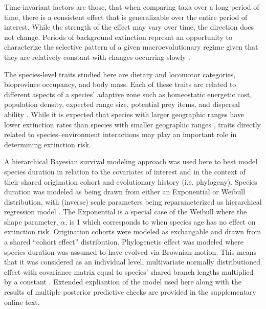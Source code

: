 \documentclass[12pt]{article}
\begin{document}
Time-invariant factors are those, that when comparing taxa over a long period of time, there is a consistent effect that is generalizable over the entire period of interest. While the strength of the effect may vary over time, the direction does not change. Periods of background extinction represnt an opportunity to characterize the selective pattern of a given macroevolutionary regime given that they are relatively constant with changes occurring slowly \cite{Jablonski1986,Raup1988}.

The species-level traits studied here are dietary and locomotor categories, bioprovince occupancy, and body mass. Each of these traits are related to different aspects of a species' adaptive zone such as homeostatic energetic cost, population density, expected range size, potential prey items, and dispersal ability \cite{Smith2004,Jernvall2004}. While it is expected that species with larger geographic ranges have lower extinction rates than species with smaller geographic ranges \cite{Jablonski1986,Roy2009c}, traits directly related to species--environment interactions may play an important role in determining extinction risk.

A hierarchical Bayesian survival modeling approach was used here to best model species duration in relation to the covariates of interest and in the context of their shared origination cohort and evolutionary history (i.e. phylogeny). Species duration was modeled as being drawn from either an Exponential or Weibull distribution, with (inverse) scale parameters being reparameterized as hierarchical regression model \cite{Gelman2013d}. The Exponential is a special case of the Weibull where the shape parameter, $\alpha$, is 1 which corresponds to when species age has no effect on extinction risk. Origination cohorts were modeled as exchangable and drawn from a shared ``cohort effect'' distribution. Phylogenetic effect was modeled where species duration was assumed to have evolved via Brownian motion. This means that it was considered as an individual level, multivariate normally distributioned effect with covariance matrix equal to species' shared branch lengths multiplied by a constant \cite{Lynch1991}. Extended expliantion of the model used here along with the results of multiple posterior predictive checks are provided in the supplementary online text.
\end{document}
